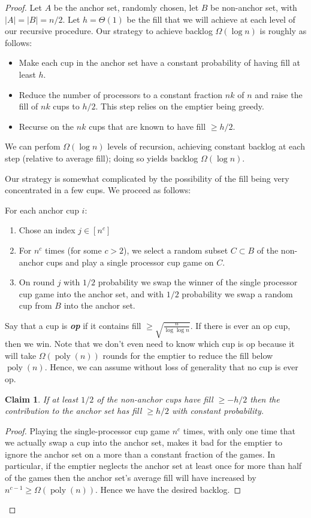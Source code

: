 \documentclass[twocolumn]{article}[11pt]
\newcommand{\defn}[1]{{\textit{\textbf{\boldmath #1}}}}
\DeclareMathOperator{\poly}{\text{poly}}
\newtheorem{clm}{Claim}
\begin{document}
\begin{proof}
  Let $A$ be the anchor set, randomly chosen, let $B$ be non-anchor set, with
  $|A| = |B| = n/2$. Let $h = \Theta(1)$ be the fill that we will achieve at
  each level of our recursive procedure.
Our strategy to achieve backlog $\Omega(\log n)$ is roughly as follows:
\begin{itemize}
  \item Make each cup in the anchor set have a constant probability of having
    fill at least $h$.
  \item Reduce the number of processors to a constant fraction $nk$ of $n$ and
    raise the fill of $nk$ cups to $h/2$. This step relies on the emptier being
    greedy.
  \item Recurse on the $nk$ cups that are known to have fill $\ge h/2$.
\end{itemize}
We can perfom $\Omega(\log n)$ levels of recursion, achieving constant backlog
at each step (relative to average fill); doing so yields backlog $\Omega(\log
n)$.

Our strategy is somewhat complicated by the possibility of the fill being very concentrated in a few cups. We proceed as follows:

For each anchor cup $i$:
\begin{enumerate}
  \item Chose an index $j \in [n^c]$
  \item For $n^c$ times (for some $c > 2$), we select a random subset $C\subset B$ of the non-anchor
    cups and play a single processor cup game on $C$.
  \item On round $j$ with $1/2$ probability we swap the winner of the single
    processor cup game into the anchor set, and with $1/2$ probability we swap
    a random cup from $B$ into the anchor set.
\end{enumerate}

Say that a cup is \defn{op} if it contains fill $\ge \sqrt{\frac{n}{\log\log
n}}$. If there is ever an op cup, then we win. Note that we don't even need to
know which cup is op because it will take $\Omega(\poly(n))$ rounds for the
emptier to reduce the fill below $\poly(n)$. Hence, we can assume without loss
of generality that no cup is ever op.


\begin{clm}
  \label{clm:reg}
  If at least $1/2$ of the non-anchor cups have fill $\ge -h/2$ then the
  contribution to the anchor set has fill $\ge h/2$ with constant probability. 
\end{clm}
\begin{proof}
  Playing the single-processor cup game $n^c$ times, with only one time
  that we actually swap a cup into the anchor set, makes it bad for the emptier
  to ignore the anchor set on a more than a constant fraction of the games.
  In particular, if the emptier neglects the anchor set at least once for more
  than half of the games then the anchor set's average fill will have increased
  by $n^{c-1} \ge \Omega(\poly(n))$. Hence we have the desired backlog.


\end{proof}
\end{proof}
\end{document}
